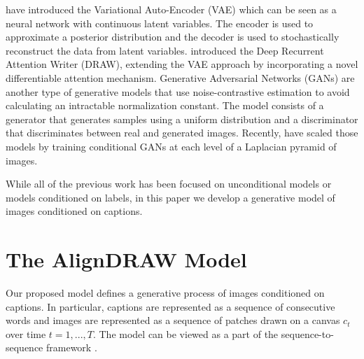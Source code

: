 \documentclass{article} %
\newcommand{\icaption}{{\bf{y}}}
\newcommand{\oimage}{{\bf{x}}}
\begin{document}
\cite{kingma_vae} have introduced the Variational Auto-Encoder (VAE) which can be seen as a neural network with continuous latent variables. The encoder is used to approximate a posterior distribution and the decoder is used to stochastically reconstruct the data from latent variables. 
\cite{gregor_draw} introduced the Deep Recurrent Attention Writer (DRAW), extending the VAE approach by incorporating a novel differentiable attention mechanism.
Generative Adversarial Networks (GANs) \citep{goodfellow_gan} are another type of generative models that use noise-contrastive estimation \citep{gutmann_nce} to avoid calculating an intractable normalization constant. The model consists of a generator that generates samples using a uniform distribution and a discriminator that discriminates between real and generated images. 
Recently, \cite{denton_lapgan} have scaled those models by training conditional GANs at each level of a Laplacian pyramid of images. 

While all of the previous work has been focused on unconditional models or models conditioned on labels, %
in this paper we develop a generative model of images conditioned on captions.

\section{The AlignDRAW Model}
\vspace{-0.1in}
\label{sec:model}
Our proposed model 
defines a generative process of images conditioned on captions. In particular, captions are represented as a sequence of consecutive words and images are represented as a sequence of patches drawn on a canvas $c_t$ over time $t=1,...,T$. The model can be viewed as a part of the sequence-to-sequence framework \citep{ilya_mt,cho_mt,nitish_video}.
\end{document}
